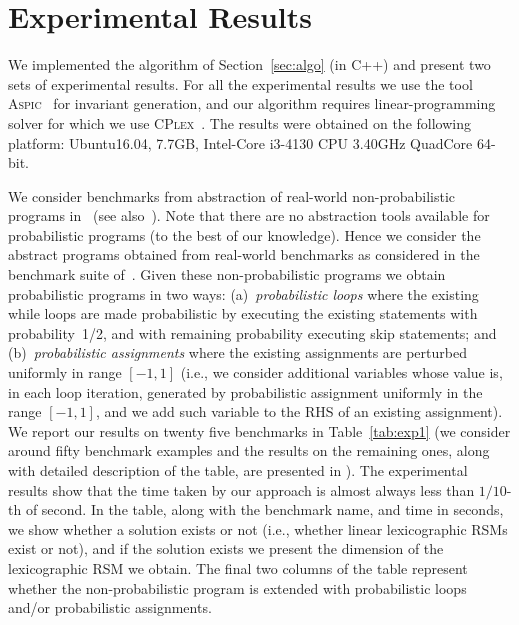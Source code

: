 \section{Experimental Results}\label{sec:experiments}
We implemented the algorithm of Section~\ref{sec:algo} (in C++) and 
present two sets of experimental results.
For all the experimental results we use the tool 
\textsc{Aspic}~\cite{FG10:aspic} for 
invariant generation, 
and our algorithm requires linear-programming solver for which we use 
\textsc{CPlex}~\cite{cplex}.
The results were obtained on the following platform: 
Ubuntu16.04, 7.7GB, Intel-Core i3-4130 CPU 3.40GHz QuadCore 64-bit.


\smallskip{}
We consider benchmarks from abstraction of real-world non-probabilistic 
programs 
in~\cite{ADFG10:lexicographic} (see also~\cite{CCGSY08:ranking-abstractions}).
Note that there are no abstraction tools available for probabilistic programs 
(to the best of our knowledge). 
Hence we consider the abstract programs obtained from real-world benchmarks as 
considered in the benchmark suite of~\cite{ADFG10:lexicographic}.
Given these non-probabilistic programs we obtain probabilistic programs in two ways:
(a)~{\em probabilistic loops} where the existing while loops are made probabilistic 
by executing the existing statements with probability~1/2, and with remaining 
probability executing skip statements; and
(b)~{\em probabilistic assignments} where the existing assignments are perturbed uniformly in range $[-1,1]$ 
(i.e., we consider additional variables whose value is, in each loop iteration, generated by 
probabilistic assignment uniformly in the range $[-1,1]$, and we add such variable 
to the RHS of an existing assignment).
We report our results on twenty five benchmarks in Table~\ref{tab:exp1} (we 
consider around fifty benchmark examples and the results on the remaining ones,
along with detailed description of the table, are presented in \AppendixMaterial).
The experimental results show that the time taken by our approach is almost always less 
than $1/10$-th of second.
In the table, along with the benchmark name, and time in seconds, we show 
whether a solution exists or not (i.e., whether linear lexicographic RSMs exist
or not), and if the solution exists we present the dimension of the lexicographic RSM
we obtain. 
The final two columns of the table represent whether the non-probabilistic 
program is extended with probabilistic loops and/or probabilistic assignments.


